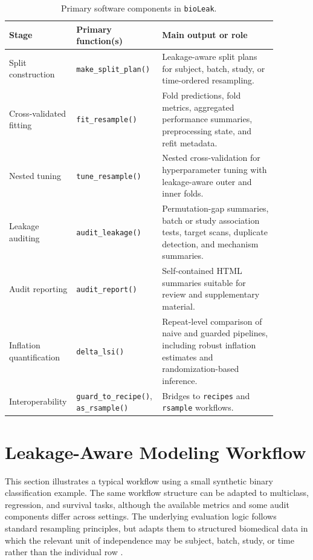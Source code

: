 \documentclass[article]{jss}
\begin{document}
\begin{table}[tbp]
\centering
\caption{Primary software components in \texttt{bioLeak}.}
\label{tab:components}
\begin{tabular}{|p{0.21\linewidth}|p{0.25\linewidth}|p{0.42\linewidth}|}
\hline
\textbf{Stage} & \textbf{Primary function(s)} & \textbf{Main output or role} \\
\hline
Split construction & \texttt{make\_split\_plan()} & Leakage-aware split plans for subject, batch, study, or time-ordered resampling. \\
\hline
Cross-validated fitting & \texttt{fit\_resample()} & Fold predictions, fold metrics, aggregated performance summaries, preprocessing state, and refit metadata. \\
\hline
Nested tuning & \texttt{tune\_resample()} & Nested cross-validation for hyperparameter tuning with leakage-aware outer and inner folds. \\
\hline
Leakage auditing & \texttt{audit\_leakage()} & Permutation-gap summaries, batch or study association tests, target scans, duplicate detection, and mechanism summaries. \\
\hline
Audit reporting & \texttt{audit\_report()} & Self-contained HTML summaries suitable for review and supplementary material. \\
\hline
Inflation quantification & \texttt{delta\_lsi()} & Repeat-level comparison of naive and guarded pipelines, including robust inflation estimates and randomization-based inference. \\
\hline
Interoperability & \texttt{guard\_to\_recipe()}, \texttt{as\_rsample()} & Bridges to \texttt{recipes} and \texttt{rsample} workflows. \\
\hline
\end{tabular}
\end{table}

\section{Leakage-Aware Modeling Workflow}

This section illustrates a typical workflow using a small synthetic binary classification example. The same workflow structure can be adapted to multiclass, regression, and survival tasks, although the available metrics and some audit components differ across settings. The underlying evaluation logic follows standard resampling principles, but adapts them to structured biomedical data in which the relevant unit of independence may be subject, batch, study, or time rather than the individual row \citep{stone1974, kohavi1995, arlot2010}.
\end{document}
